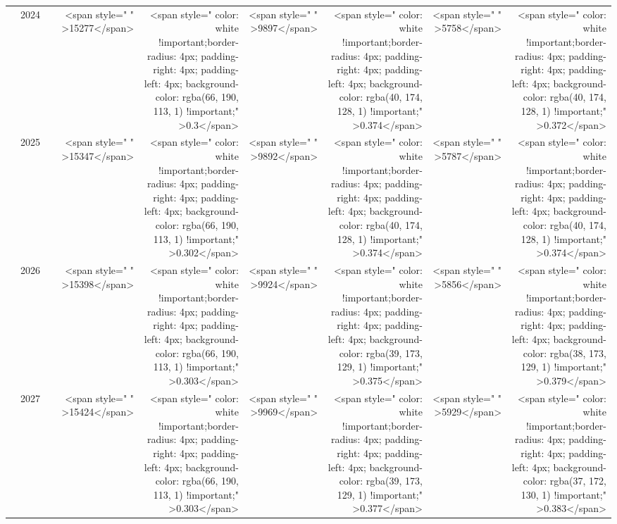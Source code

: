 \begin{table}
\begin{tabular}[t]{>{}l|l>{}rr>{}r|rrrr}
 & 2024 & \cellcolor[HTML]{AFA473}{\textcolor{white}{634}} & <span style="     " >15277</span> & <span style="     color: white !important;border-radius: 4px; padding-right: 4px; padding-left: 4px; background-color: rgba(66, 190, 113, 1) !important;" >0.3</span> & <span style="     " >9897</span> & <span style="     color: white !important;border-radius: 4px; padding-right: 4px; padding-left: 4px; background-color: rgba(40, 174, 128, 1) !important;" >0.374</span> & <span style="     " >5758</span> & <span style="     color: white !important;border-radius: 4px; padding-right: 4px; padding-left: 4px; background-color: rgba(40, 174, 128, 1) !important;" >0.372</span>\\

 & 2025 & \cellcolor[HTML]{9F9777}{\textcolor{white}{658}} & <span style="     " >15347</span> & <span style="     color: white !important;border-radius: 4px; padding-right: 4px; padding-left: 4px; background-color: rgba(66, 190, 113, 1) !important;" >0.302</span> & <span style="     " >9892</span> & <span style="     color: white !important;border-radius: 4px; padding-right: 4px; padding-left: 4px; background-color: rgba(40, 174, 128, 1) !important;" >0.374</span> & <span style="     " >5787</span> & <span style="     color: white !important;border-radius: 4px; padding-right: 4px; padding-left: 4px; background-color: rgba(40, 174, 128, 1) !important;" >0.374</span>\\

 & 2026 & \cellcolor[HTML]{918C78}{\textcolor{white}{681}} & <span style="     " >15398</span> & <span style="     color: white !important;border-radius: 4px; padding-right: 4px; padding-left: 4px; background-color: rgba(66, 190, 113, 1) !important;" >0.303</span> & <span style="     " >9924</span> & <span style="     color: white !important;border-radius: 4px; padding-right: 4px; padding-left: 4px; background-color: rgba(39, 173, 129, 1) !important;" >0.375</span> & <span style="     " >5856</span> & <span style="     color: white !important;border-radius: 4px; padding-right: 4px; padding-left: 4px; background-color: rgba(38, 173, 129, 1) !important;" >0.379</span>\\

 & 2027 & \cellcolor[HTML]{888579}{\textcolor{white}{696}} & <span style="     " >15424</span> & <span style="     color: white !important;border-radius: 4px; padding-right: 4px; padding-left: 4px; background-color: rgba(66, 190, 113, 1) !important;" >0.303</span> & <span style="     " >9969</span> & <span style="     color: white !important;border-radius: 4px; padding-right: 4px; padding-left: 4px; background-color: rgba(39, 173, 129, 1) !important;" >0.377</span> & <span style="     " >5929</span> & <span style="     color: white !important;border-radius: 4px; padding-right: 4px; padding-left: 4px; background-color: rgba(37, 172, 130, 1) !important;" >0.383</span>\\


\end{tabular}
\end{table}
